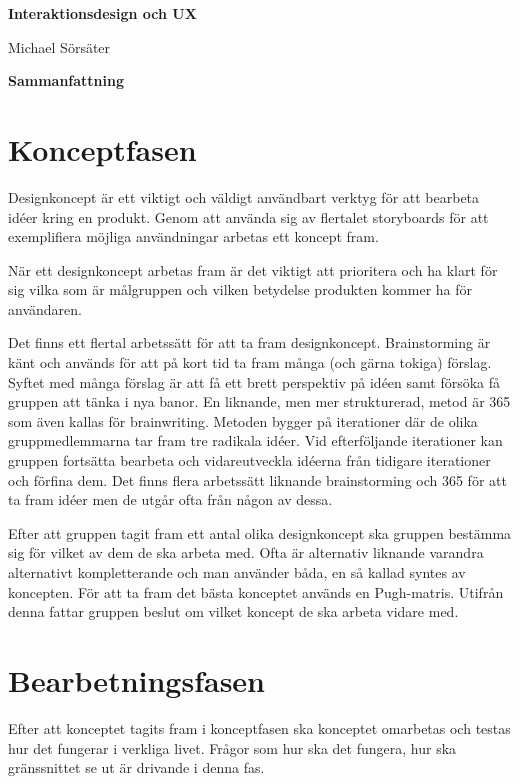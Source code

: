 \documentclass[12pt,a4paper]{article}
\begin{document}
\begin{center}
    \Huge
    \textbf{Interaktionsdesign och UX}

    \vspace{0.3cm}
    \Large
    Michael Sörsäter
    
    \vspace{0.7cm}
    \textbf{Sammanfattning}
\end{center}

\section{Konceptfasen}
Designkoncept är ett viktigt och väldigt användbart verktyg för att bearbeta idéer kring en produkt. Genom att använda sig av flertalet storyboards för att exemplifiera möjliga användningar arbetas ett koncept fram. 

När ett designkoncept arbetas fram är det viktigt att prioritera och ha klart för sig vilka som är målgruppen och vilken betydelse produkten kommer ha för användaren.

Det finns ett flertal arbetssätt för att ta fram designkoncept. Brainstorming är känt och används för att på kort tid ta fram många (och gärna tokiga) förslag. Syftet med många förslag är att få ett brett perspektiv på idéen samt försöka få gruppen att tänka i nya banor. En liknande, men mer strukturerad, metod är 365 som även kallas för brainwriting. Metoden bygger på iterationer där de olika gruppmedlemmarna tar fram tre radikala idéer. Vid efterföljande iterationer kan gruppen fortsätta bearbeta och vidareutveckla idéerna från tidigare iterationer och förfina dem. Det finns flera arbetssätt liknande brainstorming och 365 för att ta fram idéer men de utgår ofta från någon av dessa.

Efter att gruppen tagit fram ett antal olika designkoncept ska gruppen bestämma sig för vilket av dem de ska arbeta med. Ofta är alternativ liknande varandra alternativt kompletterande och man använder båda, en så kallad syntes av koncepten. För att ta fram det bästa konceptet används en Pugh-matris. Utifrån denna fattar gruppen beslut om vilket koncept de ska arbeta vidare med.

\section{Bearbetningsfasen}
Efter att konceptet tagits fram i konceptfasen ska konceptet omarbetas och testas hur det fungerar i verkliga livet. Frågor som hur ska det fungera, hur ska gränssnittet se ut är drivande i denna fas. 
\end{document}
